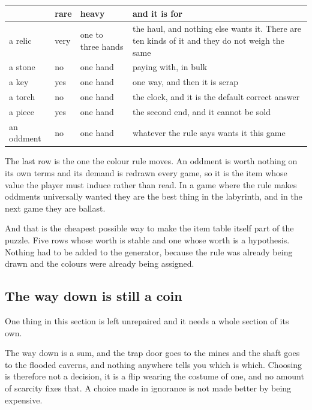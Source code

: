 \documentclass[11pt,a4paper]{article}
\begin{document}
\begin{center}
\begin{tabular}{@{}l@{\hspace{4mm}}l@{\hspace{4mm}}l@{\hspace{4mm}}>{\raggedright\arraybackslash}p{}@{}}
\toprule
& \textbf{rare} & \textbf{heavy} & \textbf{and it is for} \\
\midrule
a relic     & very & one to three hands & the haul, and nothing else wants it. There are ten kinds of it and they do not weigh the same \\
a stone     & no   & one hand  & paying with, in bulk \\
a key       & yes  & one hand  & one way, and then it is scrap \\
a torch     & no   & one hand  & the clock, and it is the default correct answer \\
a piece     & yes  & one hand  & the second end, and it cannot be sold \\
an oddment  & no   & one hand  & whatever the rule says wants it this game \\
\bottomrule
\end{tabular}
\end{center}

The last row is the one the colour rule moves. An oddment is worth nothing on its own terms and its
demand is redrawn every game, so it is the item whose value the player must induce rather than
read. In a game where the rule makes oddments universally wanted they are the best thing in the
labyrinth, and in the next game they are ballast.

\begin{sectionbox}
And that is the cheapest possible way to make the item table itself part of the puzzle. Five rows
whose worth is stable and one whose worth is a hypothesis. Nothing had to be added to the
generator, because the rule was already being drawn and the colours were already being assigned.
\end{sectionbox}

\subsection{The way down is still a coin}

One thing in this section is left unrepaired and it needs a whole section of its own.

The way down is a sum, and the trap door goes to the mines and the shaft goes to the flooded caverns,
and nothing anywhere tells you which is which. Choosing is therefore not a decision, it is a flip
wearing the costume of one, and no amount of scarcity fixes that. A choice made in ignorance is
not made better by being expensive.
\end{document}
